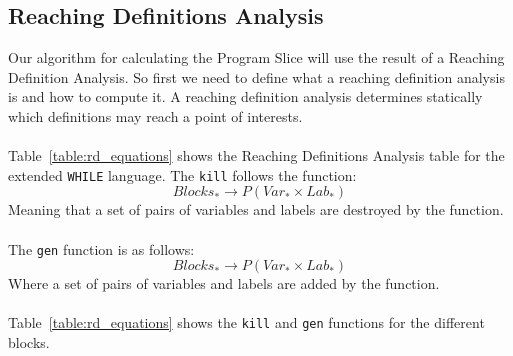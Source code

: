 \subsection{Reaching Definitions Analysis}
Our algorithm for calculating the Program Slice will use the result of a Reaching Definition Analysis. So first we need to define what a reaching definition analysis is and how to compute it. A reaching definition analysis determines statically which definitions may reach a point of interests.
\\\\
Table~\ref{table:rd_equations} shows the Reaching Definitions Analysis table for the extended \texttt{WHILE} language. The \texttt{kill} follows the function:
\begin{equation}
	Blocks_{*}\rightarrow P(Var_{*}\times Lab_{*})
\end{equation}
Meaning that a set of pairs of variables and labels are destroyed by the function.
\\\\
The \texttt{gen} function is as follows:
\begin{equation}
	Blocks_{*}\rightarrow P(Var_{*}\times Lab_{*})
\end{equation}
Where a set of pairs of variables and labels are added by the function.
\\\\
Table~\ref{table:rd_equations} shows the \texttt{kill} and \texttt{gen} functions for the different blocks.
